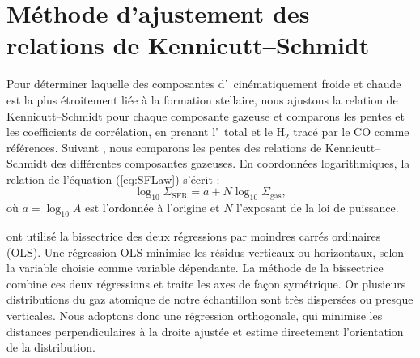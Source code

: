 \section[Méthode d'ajustement des relations de Kennicutt--Schmidt]{Méthode d'ajustement des relations de Kennicutt--Schmidt}
\label{sec:ks_fitting}
\label{sec:sflaw}


\label{sec:ks_fitting_method}
Pour déterminer laquelle des composantes d'\HI\ cinématiquement froide et chaude est la plus étroitement liée à la formation stellaire, nous ajustons la relation de Kennicutt--Schmidt pour chaque composante gazeuse et comparons les pentes et les coefficients de corrélation, en prenant l'\HI\ total et le H$_2$ tracé par le CO comme références.
Suivant \citet{Fbigiel2008}, nous comparons les pentes des relations de Kennicutt--Schmidt des différentes composantes gazeuses. En coordonnées logarithmiques, la relation de l'équation (\ref{eq:SFLaw}) s'écrit :
\begin{equation}
\label{eq:ks_log_relation}
\log_{10}\Sigma_{\mathrm{SFR}} = a + N\log_{10}\Sigma_{\mathrm{gas}},
\end{equation}
\noindent où $a=\log_{10}A$ est l'ordonnée à l'origine et $N$ l'exposant de la loi de puissance.

\citet{Fbigiel2008} ont utilisé la bissectrice des deux régressions par moindres carrés ordinaires (OLS). Une régression OLS minimise les résidus verticaux ou horizontaux, selon la variable choisie comme variable dépendante. La méthode de la bissectrice combine ces deux régressions et traite les axes de façon symétrique. Or plusieurs distributions du gaz atomique de notre échantillon sont très dispersées ou presque verticales. Nous adoptons donc une régression orthogonale, qui minimise les distances perpendiculaires à la droite ajustée et estime directement l'orientation de la distribution.

